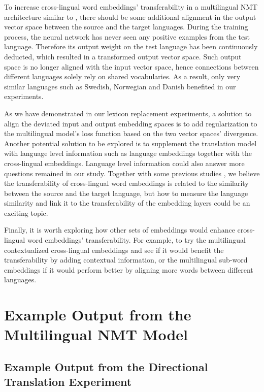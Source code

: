 \documentclass[thesis,fonts=libertine]{cluu}
\begin{document}
To increase cross-lingual word embeddings' transferability in a multilingual NMT architecture similar to \textcite{Johnson:2016aa}, there should be some additional alignment in the output vector space between the source and the target languages. During the training process, the neural network has never seen any positive examples from the test language. Therefore its output weight on the test language has been continuously deducted, which resulted in a transformed output vector space. Such output space is no longer aligned with the input vector space, hence connections between different languages solely rely on shared vocabularies. As a result, only very similar languages such as Swedish, Norwegian and Danish benefited in our experiments.

As we have demonstrated in our lexicon replacement experiments, a solution to align the deviated input and output embedding spaces is to add regularization to the multilingual model's loss function based on the two vector spaces' divergence. Another potential solution to be explored is to supplement the translation model with language level information such as language embeddings \parencite{littell-etal-2017-uriel,malaviya-etal-2017-learning} together with the cross-lingual embeddings. Language level information could also answer more questions remained in our study. Together with some previous studies \parencite{Qi:2018aa,aji-etal-2020-neural}, we believe the transferability of cross-lingual word embeddings is related to the similarity between the source and the target language, but how to measure the language similarity and link it to the transferability of the embedding layers could be an exciting topic.

Finally, it is worth exploring how other sets of embeddings would enhance cross-lingual word embeddings' transferability. For example, to try the multilingual contextualized cross-lingual embeddings \textcite{devlin-etal-2019-bert} and see if it would benefit the transferability by adding contextual information, or the multilingual sub-word embeddings \textcite{Heinzerling:2017aa} if it would perform better by aligning more words between different languages.

\appendix
\chapter{Example Output from the Multilingual NMT Model}
\label{chap:example_output}

\section{Example Output from the Directional Translation Experiment}
\label{sec:directional_output}
\end{document}
